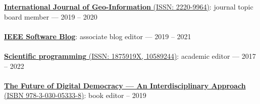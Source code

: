 \href{https://www.mdpi.com/journal/ijgi/}{\textbf{International Journal of Geo-Information} (ISSN: 2220-9964)}: journal topic board member --- 2019 -- 2020
\\ \halfblankline \\
\href{http://blog.ieeesoftware.org/}{\textbf{IEEE Software Blog}}: associate blog editor --- 2019 -- 2021
\\ \halfblankline \\
\href{https://www.hindawi.com/journals/sp/}{\textbf{Scientific programming} (ISSN: 1875919X, 10589244)}: academic editor --- 2017 -- 2022
\\ \halfblankline \\
\href{https://www.springer.com/gp/book/9783030053321}{\textbf{The Future of Digital Democracy --- An Interdisciplinary Approach} (ISBN 978-3-030-05333-8)}: book editor -- 2019
